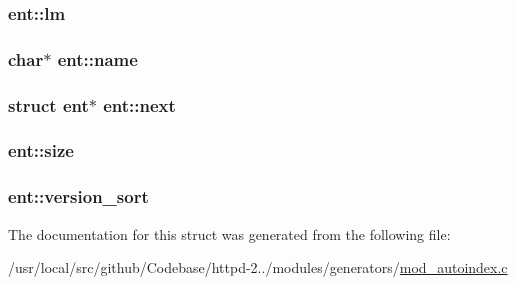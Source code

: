\subsubsection[{\texorpdfstring{lm}{lm}}]{ ent\+::lm}\hypertarget{structent_ae060d2fdf08cf16acd60205868bff888}{}\label{structent_ae060d2fdf08cf16acd60205868bff888}
\subsubsection[{\texorpdfstring{name}{name}}]{\setlength{\rightskip}{0pt plus 5cm}char$\ast$ ent\+::name}\hypertarget{structent_ae12112a008e508fd1f5bb0749ba1915a}{}\label{structent_ae12112a008e508fd1f5bb0749ba1915a}
\subsubsection[{\texorpdfstring{next}{next}}]{\setlength{\rightskip}{0pt plus 5cm}struct {\bf ent}$\ast$ ent\+::next}\hypertarget{structent_a043cc4f35d88b90312ecfc23aa411391}{}\label{structent_a043cc4f35d88b90312ecfc23aa411391}
\subsubsection[{\texorpdfstring{size}{size}}]{ ent\+::size}\hypertarget{structent_ab5d7e3a8202e048abae69ef43e8ca4b6}{}\label{structent_ab5d7e3a8202e048abae69ef43e8ca4b6}
\subsubsection[{\texorpdfstring{version\+\_\+sort}{version_sort}}]{ ent\+::version\+\_\+sort}\hypertarget{structent_a158daf0c8c1b1e94ad8d497be64d7e9f}{}\label{structent_a158daf0c8c1b1e94ad8d497be64d7e9f}


The documentation for this struct was generated from the following file\+:\begin{DoxyCompactItemize}
\item 
/usr/local/src/github/\+Codebase/httpd-\/2../modules/generators/\hyperlink{mod__autoindex_8c}{mod\+\_\+autoindex.\+c}\end{DoxyCompactItemize}
